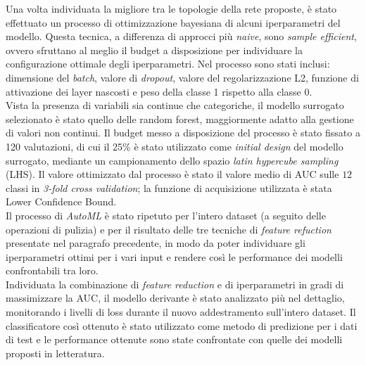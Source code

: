 Una volta individuata la migliore tra le topologie della rete proposte, è stato effettuato un processo di ottimizzazione bayesiana di alcuni iperparametri del modello. Questa tecnica, a differenza di approcci più \textit{naive}, sono \textit{sample efficient}, ovvero sfruttano al meglio il budget a disposizione per individuare la configurazione ottimale degli iperparametri. Nel processo sono stati inclusi: dimensione del \textit{batch}, valore di \textit{dropout}, valore del regolarizzazione L2, funzione di attivazione dei layer nascosti e peso della classe 1 rispetto alla classe 0.\\
Vista la presenza di variabili sia continue che categoriche, il modello surrogato selezionato è stato quello delle random forest, maggiormente adatto alla gestione di valori non continui. Il budget messo a disposizione del processo è stato fissato a 120 valutazioni, di cui il 25\% è stato utilizzato come \textit{initial design} del modello surrogato, mediante un campionamento dello spazio \textit{latin hypercube sampling} (LHS). Il valore ottimizzato dal processo è stato il valore medio di AUC sulle $12$ classi in \textit{3-fold cross validation}; la funzione di acquisizione utilizzata è stata Lower Confidence Bound.\\
Il processo di \textit{AutoML} è stato ripetuto per l'intero dataset (a seguito delle operazioni di pulizia) e per il risultato delle tre tecniche di \textit{feature refuction} presentate nel paragrafo precedente, in modo da poter individuare gli iperparametri ottimi per i vari input e rendere così le performance dei modelli confrontabili tra loro.\\

Individuata la combinazione di \textit{feature reduction} e di iperparametri in gradi di massimizzare la AUC, il modello derivante è stato analizzato più nel dettaglio, monitorando i livelli di loss durante il nuovo addestramento sull'intero dataset.
Il classificatore così ottenuto è stato utilizzato come metodo di predizione per i dati di test e le performance ottenute sono state confrontate con quelle dei modelli proposti in letteratura.\\
